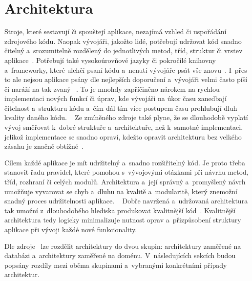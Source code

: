 \section{Architektura}

Stroje,
které sestavují či spouštejí aplikace,
nezajímá vzhled či uspořádání zdrojového kódu.
Naopak vývojáři,
jakožto lidé,
potřebují udržovat kód snadno čitelný a~srozumitelně rozdělený do jednotlivých
metod, tříd, struktur či vrstev aplikace~\cite{architecture}.
Potřebují také vysokoúrovňové jazyky či pokročilé knihovny a~frameworky,
které ulehčí psaní kódu a~nenutí vývojáře psát vše znovu~\cite{architecture}.
I~přes to ale nejsou aplikace psány dle nejlepších doporučení
a~vývojáři velmi často píší či naráží na tak zvaný ~\cite{architecture}.
To je mnohdy zapříčiněno nárokem na rychlou implementaci nových funkcí či úprav,
kde vývojáři na úkor času zanedbají čitelnost a~strukturu kódu
a~čím dál tím více postupem času prohlubují dluh kvality daného kódu.
\emph{}~\cite[str.~140]{martin_clean_architecture}
Ze zmíněného zdroje také plyne,
že se dlouhodobě vyplatí vývoj směřovat k~dobré struktuře a~architektuře,
než k~samotné implementaci,
jelikož implementace se snadno opraví,
kdežto opravit architekturu bez velkého zásahu
je značně obtížné~\cite[str.~135--146]{martin_clean_architecture}.

Cílem každé aplikace je mít udržitelný a~snadno rozšiřitelný kód.
Je proto třeba stanovit řadu pravidel,
které pomohou s~vývojovými otázkami při návrhu metod, tříd, rozhraní či
celých modulů.
Architektura a~její správný a~promyšlený návrh umožňuje vyvarovat
se chyb a~dluhu na kvalitě a~modularitě,
který znemožní snadný proces udržitelnosti aplikace.
\emph{}~\cite[str.~137]{martin_clean_architecture}
Dobře navržená a~udržovaná architektura tak umožní z~dlouhodobého hlediska
produkovat kvalitnější kód~\cite[str.~135--146]{martin_clean_architecture}.
Kvalitnější architektura tedy logicky minimalizuje nutnost oprav
a~přizpůsobení struktury aplikace při vývoji každé nové funkcionality.

Dle zdroje~\cite{architecture} lze rozdělit architektury do dvou skupin:
architektury zaměřené na databázi a~architektury zaměřené na doménu.
V~následujících sekcích budou popsány rozdíly mezi oběma skupinami
a~vybranými konkrétními případy architektur.

